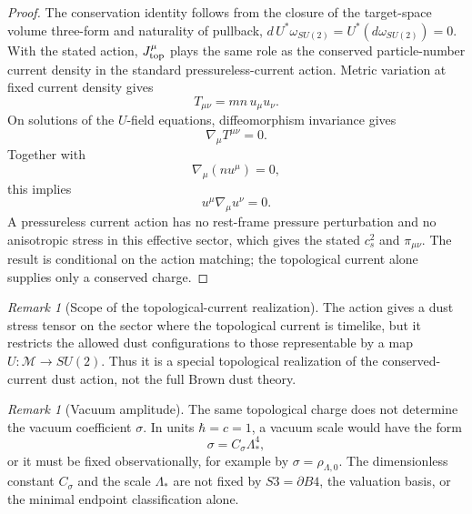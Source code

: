 \documentclass[11pt,a4paper]{article}
\def\Bfour{B4}%
\def\Sthree{S3}%
\def\dd{d}%
\numberwithin{equation}{section}
\theoremstyle{remark}
\newtheorem{remark}[criterion]{Remark}
\newcommand{\Sthree}{S^3}
\newcommand{\Bfour}{B^4}
\newcommand{\M}{\mathcal{M}}
\newcommand{\dd}{\mathrm{d}}
\begin{document}
\begin{proof}
The conservation identity follows from the closure of the target-space volume three-form and naturality of pullback, \(\dd\,U^*\omega_{SU(2)}=U^*(\dd\omega_{SU(2)})=0\). With the stated action, \(J^\mu_{\rm top}\) plays the same role as the conserved particle-number current density in the standard pressureless-current action. Metric variation at fixed current density gives
\begin{equation}
T_{\mu\nu}=mn\,u_\mu u_\nu.
\end{equation}
On solutions of the \(U\)-field equations, diffeomorphism invariance gives
\begin{equation}
\nabla_\mu T^{\mu\nu}=0.
\end{equation}
Together with
\begin{equation}
\nabla_\mu(nu^\mu)=0,
\end{equation}
this implies
\begin{equation}
u^\mu\nabla_\mu u^\nu=0.
\end{equation}
A pressureless current action has no rest-frame pressure perturbation and no anisotropic stress in this effective sector, which gives the stated \(c_s^2\) and \(\pi_{\mu\nu}\). The result is conditional on the action matching; the topological current alone supplies only a conserved charge.
\end{proof}

\begin{remark}[Scope of the topological-current realization]
The action gives a dust stress tensor on the sector where the topological current is timelike, but it restricts the allowed dust configurations to those representable by a map \(U:\M\to SU(2)\). Thus it is a special topological realization of the conserved-current dust action, not the full Brown dust theory.
\end{remark}

\begin{remark}[Vacuum amplitude]
The same topological charge does not determine the vacuum coefficient \(\sigma\). In units \(\hbar=c=1\), a vacuum scale would have the form
\begin{equation}
\sigma=C_\sigma\Lambda_*^4,
\end{equation}
or it must be fixed observationally, for example by \(\sigma=\rho_{\Lambda,0}\). The dimensionless constant \(C_\sigma\) and the scale \(\Lambda_*\) are not fixed by \(\Sthree=\partial\Bfour\), the valuation basis, or the minimal endpoint classification alone.
\end{remark}
\end{document}
